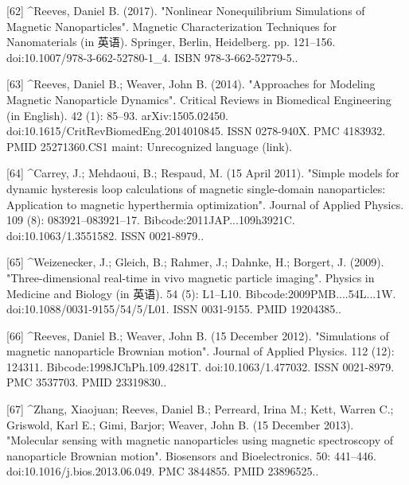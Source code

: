 [62]
^Reeves, Daniel B. (2017). "Nonlinear Nonequilibrium Simulations of Magnetic Nanoparticles". Magnetic Characterization Techniques for Nanomaterials (in 英语). Springer, Berlin, Heidelberg. pp. 121–156. doi:10.1007/978-3-662-52780-1_4. ISBN 978-3-662-52779-5..

[63]
^Reeves, Daniel B.; Weaver, John B. (2014). "Approaches for Modeling Magnetic Nanoparticle Dynamics". Critical Reviews in Biomedical Engineering (in English). 42 (1): 85–93. arXiv:1505.02450. doi:10.1615/CritRevBiomedEng.2014010845. ISSN 0278-940X. PMC 4183932. PMID 25271360.CS1 maint: Unrecognized language (link).

[64]
^Carrey, J.; Mehdaoui, B.; Respaud, M. (15 April 2011). "Simple models for dynamic hysteresis loop calculations of magnetic single-domain nanoparticles: Application to magnetic hyperthermia optimization". Journal of Applied Physics. 109 (8): 083921–083921–17. Bibcode:2011JAP...109h3921C. doi:10.1063/1.3551582. ISSN 0021-8979..

[65]
^Weizenecker, J.; Gleich, B.; Rahmer, J.; Dahnke, H.; Borgert, J. (2009). "Three-dimensional real-time in vivo magnetic particle imaging". Physics in Medicine and Biology (in 英语). 54 (5): L1–L10. Bibcode:2009PMB....54L...1W. doi:10.1088/0031-9155/54/5/L01. ISSN 0031-9155. PMID 19204385..

[66]
^Reeves, Daniel B.; Weaver, John B. (15 December 2012). "Simulations of magnetic nanoparticle Brownian motion". Journal of Applied Physics. 112 (12): 124311. Bibcode:1998JChPh.109.4281T. doi:10.1063/1.477032. ISSN 0021-8979. PMC 3537703. PMID 23319830..

[67]
^Zhang, Xiaojuan; Reeves, Daniel B.; Perreard, Irina M.; Kett, Warren C.; Griswold, Karl E.; Gimi, Barjor; Weaver, John B. (15 December 2013). "Molecular sensing with magnetic nanoparticles using magnetic spectroscopy of nanoparticle Brownian motion". Biosensors and Bioelectronics. 50: 441–446. doi:10.1016/j.bios.2013.06.049. PMC 3844855. PMID 23896525..